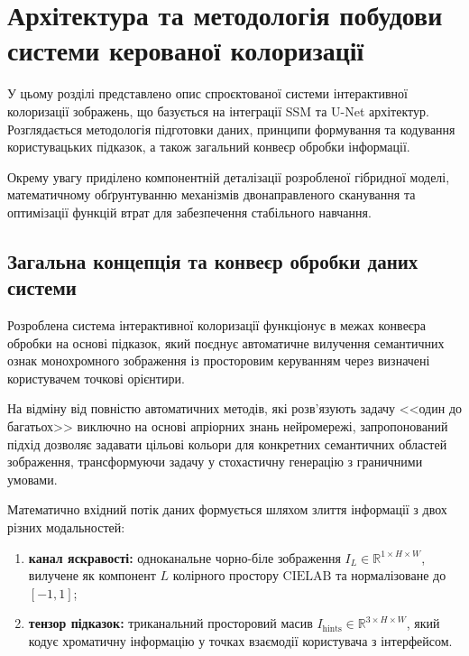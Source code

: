 
\chapter{Архітектура та методологія побудови системи керованої колоризації}
    \label{chap:implementation}
        У цьому розділі представлено опис спроєктованої системи інтерактивної колоризації зображень, що базується на інтеграції SSM та U-Net архітектур.
        Розглядається методологія підготовки даних, принципи формування та кодування користувацьких підказок, а також загальний конвеєр обробки інформації. 
        
        Окрему увагу приділено компонентній деталізації розробленої гібридної моделі, математичному обґрунтуванню механізмів двонаправленого сканування та оптимізації функцій втрат для забезпечення стабільного навчання.

    \section{Загальна концепція та конвеєр обробки даних системи}
        Розроблена система інтерактивної колоризації функціонує в межах конвеєра обробки на основі підказок,
        який поєднує автоматичне вилучення семантичних ознак монохромного зображення із просторовим керуванням через визначені користувачем точкові орієнтири.
        
        На відміну від повністю автоматичних методів, які розв'язують задачу <<один до багатьох>> виключно на основі апріорних знань нейромережі,
        запропонований підхід дозволяє задавати цільові кольори для конкретних семантичних областей зображення,
        трансформуючи задачу у стохастичну генерацію з граничними умовами.

        Математично вхідний потік даних формується шляхом злиття інформації з двох різних модальностей:
        \begin{enumerate}
            \item \textbf{канал яскравості:} одноканальне чорно-біле зображення $I_L \in \mathbb{R}^{1 \times H \times W}$, вилучене як компонент $L$ колірного простору $\mathrm{CIELAB}$ та нормалізоване до $[-1, 1]$;
            \item \textbf{тензор підказок:} триканальний просторовий масив $I_{\mathrm{hints}} \in \mathbb{R}^{3 \times H \times W}$, який кодує хроматичну інформацію у точках взаємодії користувача з інтерфейсом.
        \end{enumerate}

